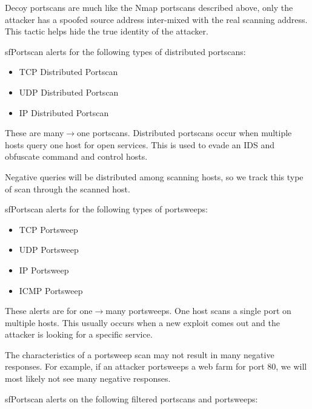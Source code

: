 \documentclass[english]{report}
\newenvironment{note}{
\samepage
    \vspace{10pt}{\textsf{
        {\hspace{7pt}\Huge{$\triangle$\hspace{-12.5pt}{\Large{$^!$}}}}\hspace{5pt}
        {\Large{NOTE}}
    }
    }
   \begin{center}
    \par\vspace{-17pt}

    \begin{lrbox}{\savepar}
    \begin{minipage}[r]{6in}
}
{
    \end{minipage}
    \end{lrbox}
    \fbox{
        \usebox{
            \savepar
	}
    }
    \par\vskip10pt
    \end{center}
}
\newenvironment{note}{
        \begin{rawhtml}
        <p><table border="1"><tr><td><b>
        Note:&nbsp;&nbsp;</b>
        \end{rawhtml}
}{
        \begin{rawhtml}
        </b></td></tr></table></p>
        \end{rawhtml}
}
\begin{document}
Decoy portscans are much like the Nmap portscans described above, only the
attacker has a spoofed source address inter-mixed with the real scanning
address. This tactic helps hide the true identity of the attacker.

sfPortscan alerts for the following types of distributed portscans:

\begin{itemize}
\item TCP Distributed Portscan
\item UDP Distributed Portscan
\item IP Distributed Portscan
\end{itemize}

These are many$\rightarrow$one portscans. Distributed portscans occur when
multiple hosts query one host for open services. This is used to evade an IDS
and obfuscate command and control hosts.

\begin{note}

Negative queries will be distributed among scanning hosts, so we track this
type of scan through the scanned host.

\end{note}

sfPortscan alerts for the following types of portsweeps:

\begin{itemize}
\item TCP Portsweep
\item UDP Portsweep
\item IP Portsweep
\item ICMP Portsweep
\end{itemize}

These alerts are for one$\rightarrow$many portsweeps. One host scans a single
port on multiple hosts. This usually occurs when a new exploit comes out and
the attacker is looking for a specific service. 

\begin{note}

The characteristics of a portsweep scan may not result in many negative
responses. For example, if an attacker portsweeps a web farm for port 80, we
will most likely not see many negative responses.

\end{note}

sfPortscan alerts on the following filtered portscans and portsweeps:
\end{document}
